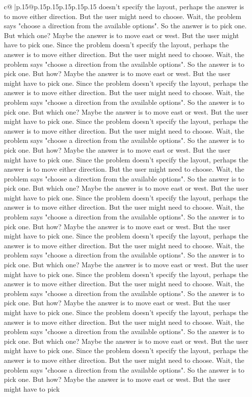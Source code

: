 \documentclass{article}
\begin{document}
{\begin{supertabular}{c@{$\;$}|p{.15\linewidth}@{}p{.15\linewidth}p{.15\linewidth}p{.15\linewidth}p{.15\linewidth}p{.15\linewidth}}
{{{doesn't specify the layout, perhaps the answer is to move either direction. But the user might need to choose. Wait, the problem says "choose a direction from the available options". So the answer is to pick one. But which one? Maybe the answer is to move east or west. But the user might have to pick one. Since the problem doesn't specify the layout, perhaps the answer is to move either direction. But the user might need to choose. Wait, the problem says "choose a direction from the available options". So the answer is to pick one. But how? Maybe the answer is to move east or west. But the user might have to pick one. Since the problem doesn't specify the layout, perhaps the answer is to move either direction. But the user might need to choose. Wait, the problem says "choose a direction from the available options". So the answer is to pick one. But which one? Maybe the answer is to move east or west. But the user might have to pick one. Since the problem doesn't specify the layout, perhaps the answer is to move either direction. But the user might need to choose. Wait, the problem says "choose a direction from the available options". So the answer is to pick one. But how? Maybe the answer is to move east or west. But the user might have to pick one. Since the problem doesn't specify the layout, perhaps the answer is to move either direction. But the user might need to choose. Wait, the problem says "choose a direction from the available options". So the answer is to pick one. But which one? Maybe the answer is to move east or west. But the user might have to pick one. Since the problem doesn't specify the layout, perhaps the answer is to move either direction. But the user might need to choose. Wait, the problem says "choose a direction from the available options". So the answer is to pick one. But how? Maybe the answer is to move east or west. But the user might have to pick one. Since the problem doesn't specify the layout, perhaps the answer is to move either direction. But the user might need to choose. Wait, the problem says "choose a direction from the available options". So the answer is to pick one. But which one? Maybe the answer is to move east or west. But the user might have to pick one. Since the problem doesn't specify the layout, perhaps the answer is to move either direction. But the user might need to choose. Wait, the problem says "choose a direction from the available options". So the answer is to pick one. But how? Maybe the answer is to move east or west. But the user might have to pick one. Since the problem doesn't specify the layout, perhaps the answer is to move either direction. But the user might need to choose. Wait, the problem says "choose a direction from the available options". So the answer is to pick one. But which one? Maybe the answer is to move east or west. But the user might have to pick one. Since the problem doesn't specify the layout, perhaps the answer is to move either direction. But the user might need to choose. Wait, the problem says "choose a direction from the available options". So the answer is to pick one. But how? Maybe the answer is to move east or west. But the user might have to pick }}}
\end{supertabular}}
\end{document}
